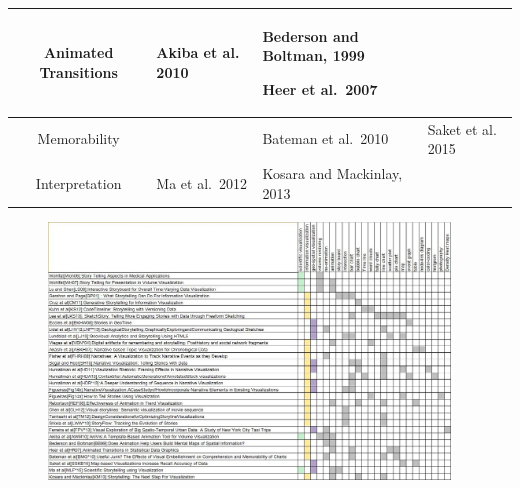 \documentclass{egpubl}
\begin{document}
\begin{table}[htbp]
\begin{tabular}{c|| p{4cm}| p{5cm}|p{4cm}}
\hline
Animated Transitions & Akiba et al.\, 2010\cite{Akiba} \par & Bederson and Boltman, 1999\cite{bedrson}\par Heer et al.\, 2007 \cite{heer2007} \par &\\
\hline
Memorability & &  Bateman et al.\, 2010\cite{bateman} \par & Saket et al.\, 2015 \cite{saket2015} \par\\ 
\hline
Interpretation &  Ma et al.\, 2012\cite{sci} \par  &  Kosara and Mackinlay, 2013\cite{Kosara} \par & \\
\end{tabular}
\label{table:classification1} 
\end{table}

\begin{figure}
\includegraphics[width=0.95\textwidth]{./images/table2}
\label{table}
\end{figure}
\end{document}
